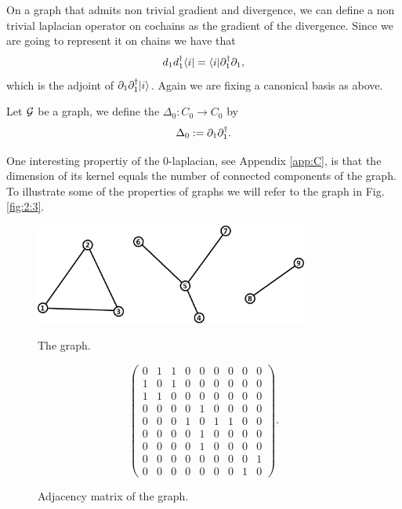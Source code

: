 \documentclass[../2.tex]{subfiles}
\begin{document}
    On a graph that admits non trivial gradient and divergence,
    we can define a non trivial laplacian operator on cochains as the gradient of the divergence.
    Since we are going to represent it on chains we have that
    \[ d_1d_1^\dagger \langle i | = \langle i |\partial_1^\dagger\partial_1, \]
    which is the adjoint of $\partial_1\partial_1^\dagger| i \rangle$.
    Again we are fixing a canonical basis as above.

    \begin{defn}
        Let $\mathcal{G}$ be a graph, we define the  $\Delta_0 : C_0 \to C_0$ by 
        \[ \Delta_0 := \partial_1 \partial^\dagger_1.\]
    \end{defn}

    One interesting propertiy of the $0$-laplacian, see Appendix \ref{app:C}, is that the dimension of its kernel equals the number of connected components of the graph.\\
    To illustrate some of the properties of graphs we will refer to the graph in Fig. \ref{fig:2:3}.

    \begin{figure}[H]
        \begin{minipage}{.5\textwidth}
            \centering
            \includegraphics[width=9cm]{sections/2/graphex}
            \caption{The graph.}
            \label{fig:2:3}
        \end{minipage}
        \begin{minipage}{.5\textwidth}
            \centering
            \[\begin{pmatrix}
                0 & 1 & 1 & 0 & 0 & 0 & 0 & 0 & 0 \\
                1 & 0 & 1 & 0 & 0 & 0 & 0 & 0 & 0 \\
                1 & 1 & 0 & 0 & 0 & 0 & 0 & 0 & 0 \\
                0 & 0 & 0 & 0 & 1 & 0 & 0 & 0 & 0 \\
                0 & 0 & 0 & 1 & 0 & 1 & 1 & 0 & 0 \\
                0 & 0 & 0 & 0 & 1 & 0 & 0 & 0 & 0 \\
                0 & 0 & 0 & 0 & 1 & 0 & 0 & 0 & 0 \\
                0 & 0 & 0 & 0 & 0 & 0 & 0 & 0 & 1 \\
                0 & 0 & 0 & 0 & 0 & 0 & 0 & 1 & 0
            \end{pmatrix}. \]
            \caption{Adjacency matrix of the graph.}
            \label{fig:2:4}
        \end{minipage}
    \end{figure}
\end{document}

